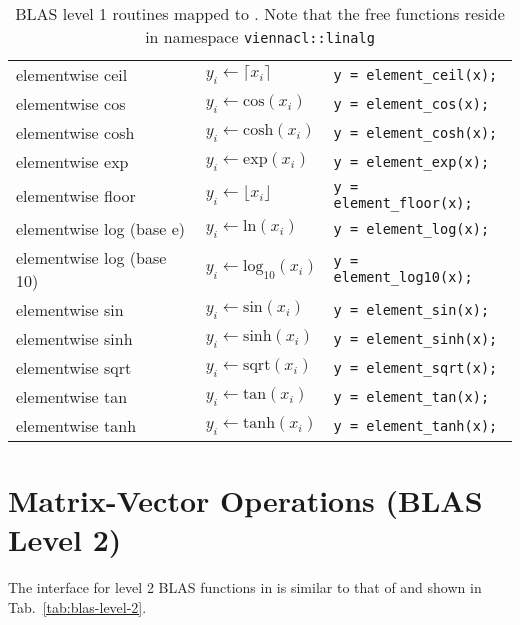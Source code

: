 \begin{table}[tb]
\begin{center}
\begin{tabular}{l|l|p{6cm}}
elementwise ceil  & $y_i \leftarrow \lceil x_i \rceil$ & \lstinline|y = element_ceil(x);| \\
elementwise cos   & $y_i \leftarrow \textrm{cos}(x_i)$ & \lstinline|y = element_cos(x);| \\
elementwise cosh  & $y_i \leftarrow \textrm{cosh}(x_i)$ & \lstinline|y = element_cosh(x);| \\
elementwise exp   & $y_i \leftarrow \textrm{exp}(x_i)$ & \lstinline|y = element_exp(x);| \\
elementwise floor & $y_i \leftarrow \lfloor x_i \rfloor $ & \lstinline|y = element_floor(x);| \\
elementwise log (base e)  & $y_i \leftarrow \textrm{ln}(x_i)$ & \lstinline|y = element_log(x);| \\
elementwise log (base 10) & $y_i \leftarrow \textrm{log}_{10}(x_i)$ & \lstinline|y = element_log10(x);| \\
elementwise sin  & $y_i \leftarrow \textrm{sin}(x_i)$ & \lstinline|y = element_sin(x);| \\
elementwise sinh & $y_i \leftarrow \textrm{sinh}(x_i)$ & \lstinline|y = element_sinh(x);| \\
elementwise sqrt & $y_i \leftarrow \textrm{sqrt}(x_i)$ & \lstinline|y = element_sqrt(x);| \\
elementwise tan  & $y_i \leftarrow \textrm{tan}(x_i)$ & \lstinline|y = element_tan(x);| \\
elementwise tanh & $y_i \leftarrow \textrm{tanh}(x_i)$ & \lstinline|y = element_tanh(x);| \\
\end{tabular}
\caption{BLAS level 1 routines mapped to {\ViennaCL}. Note that the free functions reside in namespace \texttt{viennacl::linalg}}
\label{tab:blas-level-1}
\end{center}
\end{table}

\section{Matrix-Vector Operations (BLAS Level 2)}
The interface for level 2 BLAS functions in {\ViennaCL} is similar to that of
{\ublas} and shown in Tab.~\ref{tab:blas-level-2}.




